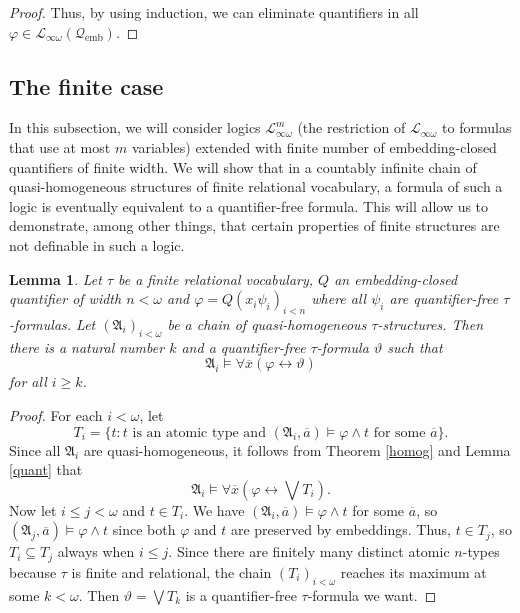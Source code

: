 \documentclass{ndjflart}
\theoremstyle{plain}
\newtheorem{lemma}[conjecture]{Lemma}
\theoremstyle{definition}
\numberwithin{equation}{section}
\DeclareMathOperator{\emb}{emb}
\begin{document}
\begin{proof}
Thus, by using induction, we can eliminate quantifiers in all $\varphi \in \mathcal{L}_{\infty\omega}(\mathcal{Q}_{\emb})$.
\end{proof}

\subsection{The finite case}

In this subsection, we will consider logics $\mathcal{L}_{\infty\omega}^m$ (the restriction of $\mathcal{L}_{\infty\omega}$ to formulas that use at most $m$ variables) extended with finite number of em\-bed\-ding-closed quantifiers of finite width.
We will show that in a countably infinite chain of quasi-homogeneous structures of finite relational vocabulary,
a formula of such a logic is eventually equivalent to a quantifier-free formula.
This will allow us to demonstrate, among other things, that certain properties of finite structures are not definable in such a logic. 



\begin{lemma}\label{quant_elim_finite_lemma}
Let $\tau$ be a finite relational vocabulary, 
$Q$ an embedding-closed quantifier of width $n<\omega$ and $\varphi = Q(x_i\psi_i)_{i<n}$ where all $\psi_i$ are quantifier-free $\tau$-formulas.
Let $(\mathfrak{A}_i)_{i<\omega}$ be a chain of quasi-homogeneous $\tau$-structures. 
Then there is a natural number $k$ and a quantifier-free $\tau$-formula $\vartheta$ such that
\[
	\mathfrak{A}_i \vDash \forall \overline{x}(\varphi \leftrightarrow \vartheta)
\]
for all $i \geq k$.
\end{lemma}
\begin{proof}
For each $i < \omega$, let 
\[
	T_i = \{t \colon t \text{ is an atomic type and } (\mathfrak{A}_i,\overline{a}) \vDash \varphi \wedge  t \text{ for some } \overline{a} \}.
\]
Since all $\mathfrak{A}_i$ are quasi-homogeneous, it follows from Theorem \ref{homog} and Lemma \ref{quant} that 
\[
	\mathfrak{A}_i \vDash \forall \overline{x}(\varphi \leftrightarrow \bigvee T_i).
\]
Now let $i \leq j < \omega$ and $t \in T_i$. We have $(\mathfrak{A}_i,\overline{a}) \vDash \varphi \wedge t$ for some $\overline{a}$, so $(\mathfrak{A}_j,\overline{a}) \vDash \varphi \wedge t$ since both $\varphi$ and $t$ are preserved by embeddings. Thus, $t \in T_j$, so $T_i \subseteq T_j$ always when $i \leq j$.
Since there are finitely many distinct atomic $n$-types because $\tau$ is finite and relational, the chain $(T_i)_{i < \omega}$ reaches its maximum at some $k < \omega$. Then $\vartheta = \bigvee T_k$ is a quantifier-free $\tau$-formula we want.
\end{proof}
\end{document}
